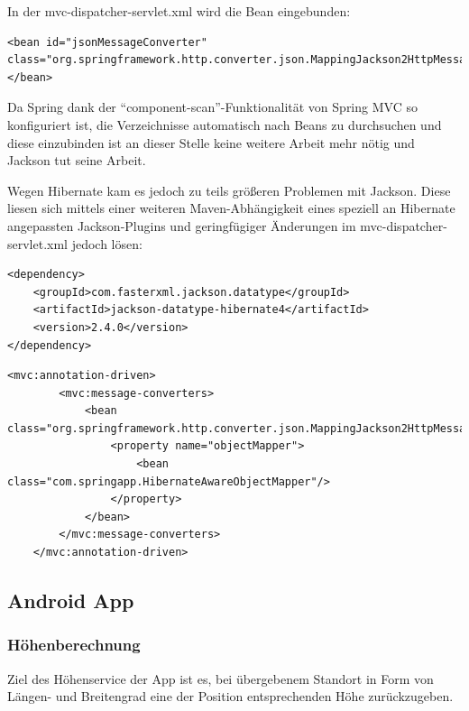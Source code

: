 In der mvc-dispatcher-servlet.xml wird die Bean eingebunden:
\lstset{language=xml}
\begin{lstlisting}[frame=htrbl, caption={Konfiguration von Jackson}, breaklines=true]
<bean id="jsonMessageConverter" class="org.springframework.http.converter.json.MappingJackson2HttpMessageConverter">
</bean>
\end{lstlisting}

Da Spring dank der ``component-scan''-Funktionalität von Spring MVC so konfiguriert ist, die Verzeichnisse automatisch nach Beans zu durchsuchen und diese einzubinden ist an dieser Stelle keine weitere Arbeit mehr nötig und Jackson tut seine Arbeit.

Wegen Hibernate kam es jedoch zu teils größeren Problemen mit Jackson. Diese liesen sich mittels einer weiteren Maven-Abhängigkeit eines speziell an Hibernate angepassten Jackson-Plugins und geringfügiger Änderungen im mvc-dispatcher-servlet.xml jedoch lösen:
\lstset{language=xml}
\begin{lstlisting}[frame=htrbl, caption={Einbindung von Jackson-datatype-hibernate4 in Maven}, breaklines=true]
<dependency>
	<groupId>com.fasterxml.jackson.datatype</groupId>
	<artifactId>jackson-datatype-hibernate4</artifactId>
	<version>2.4.0</version>
</dependency>
\end{lstlisting}
\lstset{language=xml}
\begin{lstlisting}[frame=htrbl, caption={Konfiguration von Jackson und Hibernate}, breaklines=true]
<mvc:annotation-driven>
        <mvc:message-converters>
            <bean class="org.springframework.http.converter.json.MappingJackson2HttpMessageConverter">
                <property name="objectMapper">
                    <bean class="com.springapp.HibernateAwareObjectMapper"/>
                </property>
            </bean>
        </mvc:message-converters>
    </mvc:annotation-driven>
\end{lstlisting}
\subsection{Android App}
\subsubsection{Höhenberechnung}
Ziel des Höhenservice der App ist es, bei übergebenem Standort in Form von Längen- und Breitengrad eine der Position entsprechenden Höhe zurückzugeben.
